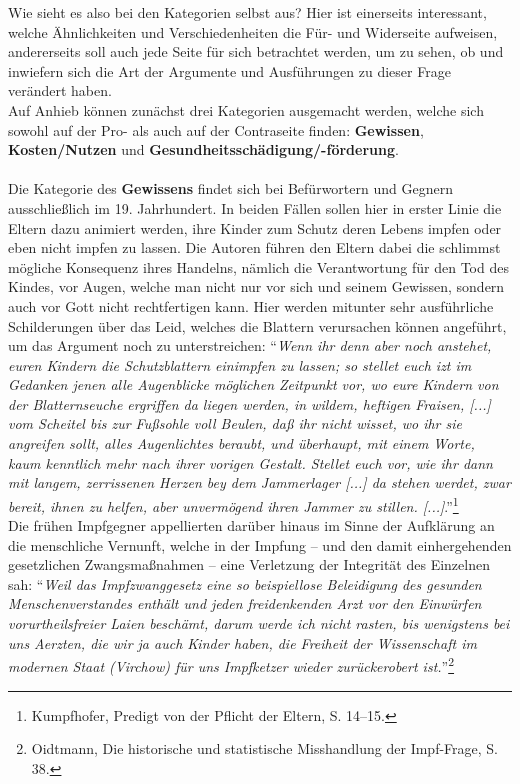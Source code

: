 \documentclass[
    a4paper,
    12pt,
    hyphens,
    chapterprefix=true,
    headheight=33pt,
    footheight=29pt,
    headings=optiontohead,
]{scrartcl}
\begin{document}
{\newpage
Wie sieht es also bei den Kategorien selbst aus? Hier ist einerseits interessant, welche Ähnlichkeiten und Verschiedenheiten die Für- und Widerseite aufweisen, andererseits soll auch jede Seite für sich betrachtet werden, um zu sehen, ob und inwiefern sich die Art der Argumente und Ausführungen zu dieser Frage verändert haben.\\
Auf Anhieb können zunächst drei Kategorien ausgemacht werden, welche sich sowohl auf der Pro- als auch auf der Contraseite finden: \textbf{Gewissen}, \textbf{Kosten/Nutzen} und \textbf{Gesundheitsschädigung/-förderung}.\\
\\
Die Kategorie des \textbf{Gewissens} findet sich bei Befürwortern und Gegnern ausschließlich im 19. Jahrhundert. In beiden Fällen sollen hier in erster Linie die Eltern dazu animiert werden, ihre Kinder zum Schutz deren Lebens impfen oder eben nicht impfen zu lassen. Die Autoren führen den Eltern dabei die schlimmst mögliche Konsequenz ihres Handelns, nämlich die Verantwortung für den Tod des Kindes, vor Augen, welche man nicht nur vor sich und seinem Gewissen, sondern auch vor Gott nicht rechtfertigen kann. Hier werden mitunter sehr ausführliche Schilderungen über das Leid, welches die Blattern verursachen können angeführt, um das Argument noch zu unterstreichen: "`\textit{Wenn ihr denn aber noch anstehet, euren Kindern die Schutzblattern einimpfen zu lassen; so stellet euch izt im Gedanken jenen alle Augenblicke möglichen Zeitpunkt vor, wo eure Kindern von der Blatternseuche ergriffen da liegen werden, in wildem, heftigen Fraisen, [...] vom Scheitel bis zur Fußsohle voll Beulen, daß ihr nicht wisset, wo ihr sie angreifen sollt,  alles Augenlichtes beraubt, und überhaupt, mit einem Worte, kaum kenntlich mehr nach ihrer vorigen Gestalt. Stellet euch vor, wie ihr dann mit langem, zerrissenen Herzen bey dem Jammerlager [...] da stehen werdet, zwar bereit, ihnen zu helfen, aber unvermögend ihren Jammer zu stillen. [...]}."'\footnote{Kumpfhofer, Predigt von der Pflicht der Eltern, S. 14--15.}\\
Die frühen Impfgegner appellierten darüber hinaus im Sinne der Aufklärung an die menschliche Vernunft, welche in der Impfung -- und den damit einhergehenden gesetzlichen Zwangsmaßnahmen -- eine Verletzung der Integrität des Einzelnen sah: "`\textit{Weil das Impfzwanggesetz eine so beispiellose Beleidigung des gesunden Menschenverstandes enthält und jeden freidenkenden Arzt vor den Einwürfen vorurtheilsfreier Laien beschämt, darum werde ich nicht rasten, bis wenigstens bei uns Aerzten, die wir ja auch Kinder haben, die Freiheit der Wissenschaft im modernen Staat (Virchow) für uns Impfketzer wieder zurückerobert ist.}"'\footnote{Oidtmann, Die historische und statistische Misshandlung der Impf-Frage, S. 38.}\\
}
\end{document}
